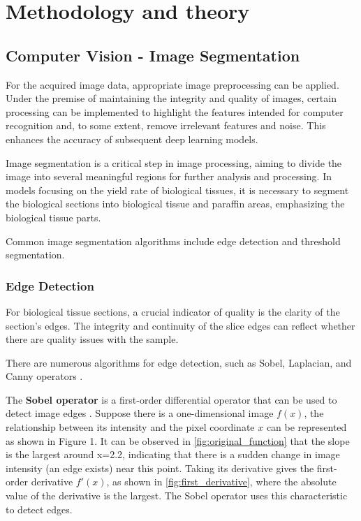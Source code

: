 \section{Methodology and theory}
\label{sec:problem_description}

\subsection{Computer Vision - Image Segmentation}

For the acquired image data, appropriate image preprocessing can be applied. Under the premise of maintaining the integrity and quality of images, certain processing can be implemented to highlight the features intended for computer recognition and, to some extent, remove irrelevant features and noise. This enhances the accuracy of subsequent deep learning models.

Image segmentation is a critical step in image processing, aiming to divide the image into several meaningful regions for further analysis and processing. In models focusing on the yield rate of biological tissues, it is necessary to segment the biological sections into biological tissue and paraffin areas, emphasizing the biological tissue parts.

Common image segmentation algorithms include edge detection and threshold segmentation.

\subsubsection{Edge Detection}
For biological tissue sections, a crucial indicator of quality is the clarity of the section's edges. The integrity and continuity of the slice edges can reflect whether there are quality issues with the sample.

There are numerous algorithms for edge detection, such as Sobel, Laplacian, and Canny operators \cite{3.1}.

The \textbf{Sobel operator} is a first-order differential operator that can be used to detect image edges \cite{补充1}. Suppose there is a one-dimensional image $f(x)$, the relationship between its intensity and the pixel coordinate $x$ can be represented as shown in Figure 1. It can be observed in \autoref{fig:original_function} that the slope is the largest around x=2.2, indicating that there is a sudden change in image intensity (an edge exists) near this point. Taking its derivative gives the first-order derivative $f'(x)$, as shown in \autoref{fig:first_derivative}, where the absolute value of the derivative is the largest. The Sobel operator uses this characteristic to detect edges.

